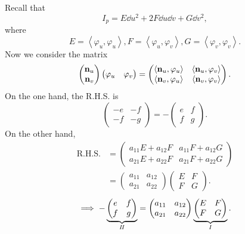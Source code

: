 Recall that 
\[
    I_p=E\dd u^2+2F \dd u\dd v+G\dd v^2,
\]
where
\[
    E=\left\langle\varphi_u,\varphi_u\right\rangle,
    F=\left\langle\varphi_u,\varphi_v\right\rangle,
    G=\left\langle\varphi_v,\varphi_v\right\rangle.    
\]
Now we consider the matrix 
\[
    \begin{pmatrix}
        \vb{n}_u\\
        \vb{n}_v
    \end{pmatrix}
    \begin{pmatrix}
        \varphi_u &\varphi_v
    \end{pmatrix}=
    \begin{pmatrix}
        \left\langle\vb{n}_u,\varphi_u\right\rangle&
        \left\langle\vb{n}_u,\varphi_v\right\rangle\\
        \left\langle\vb{n}_v,\varphi_u\right\rangle&
        \left\langle\vb{n}_v,\varphi_v\right\rangle
    \end{pmatrix}.    
\]
On the one hand, the R.H.S. is 
\[
    \begin{pmatrix}
    -e&-f\\
    -f&-g
    \end{pmatrix}=-
    \begin{pmatrix}
        e&f\\
        f&g
    \end{pmatrix}.
\]
On the other hand,
\begin{align*}
    \text{R.H.S.}&=\begin{pmatrix}
        a_{11}E+a_{12}F&
        a_{11}F+a_{12}G\\
        a_{21}E+a_{22}F&
        a_{21}F+a_{22}G
    \end{pmatrix}\\
    &=\begin{pmatrix}
        a_{11}&a_{12}\\
        a_{21}&a_{22}
    \end{pmatrix}
    \begin{pmatrix}
        E&F\\
        F&G
    \end{pmatrix}.
\end{align*}
\[
    \implies 
    -\underbrace{\begin{pmatrix}
        e&f\\
        f&g
    \end{pmatrix}}_{I\!I}
    =
    \begin{pmatrix}
        a_{11}&a_{12}\\
        a_{21}&a_{22}
    \end{pmatrix}
    \underbrace{\begin{pmatrix}
        E&F\\
        F&G
    \end{pmatrix}}_{I}.
\]
